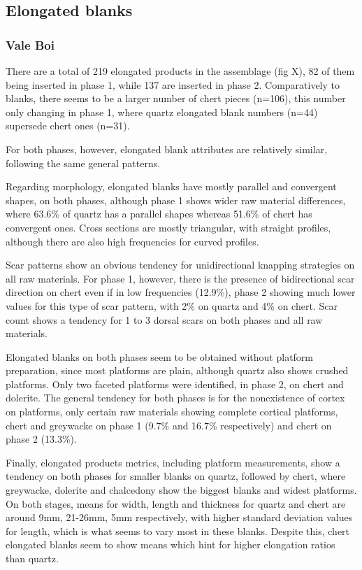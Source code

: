 \documentclass[12pt,twoside]{reedthesis}
\begin{document}
\hypertarget{elongated-blanks}{%
\subsection{Elongated blanks}\label{elongated-blanks}}

\hypertarget{vale-boi-5}{%
\subsubsection{Vale Boi}\label{vale-boi-5}}

There are a total of 219 elongated products in the assemblage (fig X), 82 of them being inserted in phase 1, while 137 are inserted in phase 2. Comparatively to blanks, there seems to be a larger number of chert pieces (n=106), this number only changing in phase 1, where quartz elongated blank numbers (n=44) supersede chert ones (n=31).

For both phases, however, elongated blank attributes are relatively similar, following the same general patterns.

Regarding morphology, elongated blanks have mostly parallel and convergent shapes, on both phases, although phase 1 shows wider raw material differences, where 63.6\% of quartz has a parallel shapes whereas 51.6\% of chert has convergent ones. Cross sections are mostly triangular, with straight profiles, although there are also high frequencies for curved profiles.

Scar patterns show an obvious tendency for unidirectional knapping strategies on all raw materials. For phase 1, however, there is the presence of bidirectional scar direction on chert even if in low frequencies (12.9\%), phase 2 showing much lower values for this type of scar pattern, with 2\% on quartz and 4\% on chert. Scar count shows a tendency for 1 to 3 dorsal scars on both phases and all raw materials.

Elongated blanks on both phases seem to be obtained without platform preparation, since most platforms are plain, although quartz also shows crushed platforms. Only two faceted platforms were identified, in phase 2, on chert and dolerite. The general tendency for both phases is for the nonexistence of cortex on platforms, only certain raw materials showing complete cortical platforms, chert and greywacke on phase 1 (9.7\% and 16.7\% respectively) and chert on phase 2 (13.3\%).

Finally, elongated products metrics, including platform measurements, show a tendency on both phases for smaller blanks on quartz, followed by chert, where greywacke, dolerite and chalcedony show the biggest blanks and widest platforms. On both stages, means for width, length and thickness for quartz and chert are around 9mm, 21-26mm, 5mm respectively, with higher standard deviation values for length, which is what seems to vary most in these blanks. Despite this, chert elongated blanks seem to show means which hint for higher elongation ratios than quartz.
\end{document}
